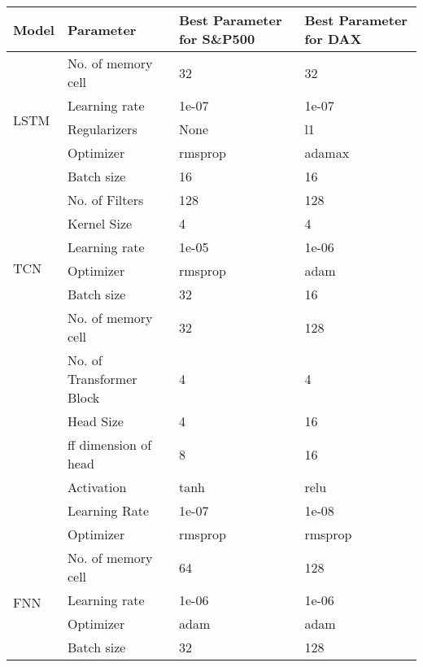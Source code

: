 \documentclass{article}
\begin{document}
\begin{table}[!h]
\centering
\begin{tabular}{|p{1.8cm}|p{3.8cm}|p{4.5cm}|p{4.5cm}|}
\hline
Model & Parameter & Best Parameter for S\&P500 &  Best Parameter for DAX \\
\hline
\multirow{5}{*}{LSTM} & No. of memory cell & 32 & 32 \\ \cline{2-4}
                      & Learning rate      & 1e-07 & 1e-07 \\ \cline{2-4}
                      & Regularizers       & None & l1 \\ \cline{2-4}
                      & Optimizer          & rmsprop & adamax \\ \cline{2-4}
                      & Batch size         & 16 & 16 \\ \hline
\multirow{6}{*}{TCN} & No. of Filters & 128 & 128 \\ \cline{2-4}
                     & Kernel Size & 4 & 4 \\ \cline{2-4}
                      & Learning rate      & 1e-05 & 1e-06 \\ \cline{2-4}
                      & Optimizer          & rmsprop & adam \\ \cline{2-4}
                      & Batch size         & 32 & 16 \\ \hline
\multirow{7}{*}{Transformer} & No. of memory cell & 32 & 128 \\ \cline{2-4}
                      & No. of Transformer Block & 4 & 4 \\ \cline{2-4}
                      & Head Size      & 4 & 16 \\ \cline{2-4}
                      & ff dimension of head  & 8 & 16 \\ \cline{2-4}
                      & Activation          & tanh & relu \\ \cline{2-4}
                      & Learning Rate       & 1e-07 & 1e-08 \\ \cline{2-4}
                      & Optimizer          & rmsprop & rmsprop \\ \hline
\multirow{4}{*}{FNN} & No. of memory cell & 64 & 128 \\ \cline{2-4}
                      & Learning rate      & 1e-06 & 1e-06 \\ \cline{2-4}
                      & Optimizer          & adam & adam \\ \cline{2-4}
                      & Batch size         & 32 & 128 \\ \hline

\end{tabular}
\end{table}
\end{document}
